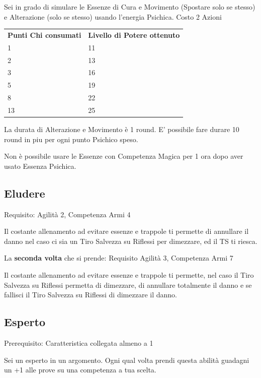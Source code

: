 \documentclass[a4paper,11pt,twoside,openany]{book}
\begin{document}
Sei in grado di simulare le Essenze di Cura e Movimento (Spostare solo se stesso) e Alterazione (solo se stesso) usando l'energia Psichica. Costo 2 Azioni

\bigskip

\begin{tabular}{ll}
	\toprule
	\textbf{Punti Chi consumati} & \textbf{Livello di Potere ottenuto}\\
	1                            & 11\\
	2                            & 13\\
	3                            & 16\\
	5                            & 19\\
	8                            & 22\\
	13                           & 25\\
\end{tabular}

\bigskip

La durata di Alterazione e Movimento è 1 round. E' possibile fare durare 10 round in piu per ogni punto Psichico speso.

Non è possibile usare le Essenze con Competenza Magica per 1 ora dopo aver usato Essenza Psichica.

\subsection{Eludere}

Requisito: Agilità 2, Competenza Armi 4

Il costante allenamento ad evitare essenze e trappole ti permette di annullare il danno nel caso ci sia un Tiro Salvezza su Riflessi per dimezzare, ed il TS ti riesca.


La \textbf{seconda volta} che si prende: Requisito Agilità 3, Competenza Armi 7

Il costante allenamento ad evitare essenze e trappole ti permette, nel caso il Tiro Salvezza su Riflessi permetta di dimezzare, di annullare totalmente il danno e se fallisci il Tiro Salvezza su Riflessi di dimezzare il danno.

\subsection{Esperto}

Prerequisito: Caratteristica collegata almeno a 1

Sei un esperto in un argomento. Ogni qual volta prendi questa abilità guadagni un +1 alle prove su una competenza a tua scelta.
\end{document}
